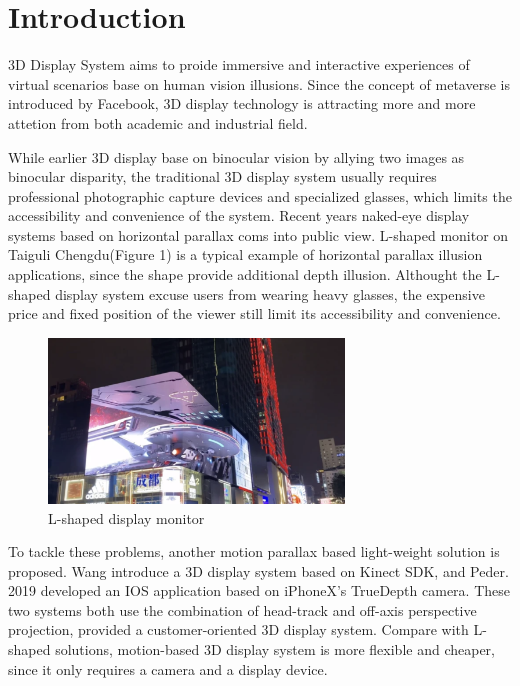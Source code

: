 
\section {Introduction}


3D Display System aims to proide immersive and interactive experiences of virtual scenarios base on human vision illusions. Since the concept of metaverse is introduced by Facebook, 3D display technology is attracting more and more attetion from both academic and industrial field.

While earlier 3D display base on binocular vision by allying two images as binocular disparity, the traditional 3D display system usually requires professional photographic capture devices and specialized glasses, which limits the accessibility and convenience of the system. Recent years naked-eye display systems based on horizontal parallax coms into public view. L-shaped monitor on Taiguli Chengdu(Figure 1) is a typical example of horizontal parallax illusion applications, since the shape provide additional depth illusion.\cite{Wang2024} Althought the L-shaped display system excuse users from wearing heavy glasses, the expensive price and fixed position of the viewer still limit its accessibility and convenience.

\begin{figure}[htb]
    \centering
    \includegraphics[width=0.7\textwidth]{figures/L-shaped.png}
    \caption{L-shaped display monitor}\label{F:test-a}
\end{figure}

To tackle these problems, another motion parallax based light-weight solution is proposed\cite{ALLISON20031879}. Wang\cite{Wang_2018} introduce a 3D display system based on Kinect SDK, and Peder. 2019 \cite{TheParallaxView} developed an IOS application based on iPhoneX's TrueDepth camera. These two systems both use the combination of head-track and off-axis perspective projection, provided a customer-oriented 3D display system. Compare with L-shaped solutions, motion-based 3D display system is more flexible and cheaper, since it only requires a camera and a display device.

